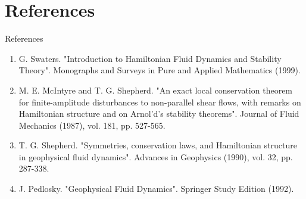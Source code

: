 \documentclass{beamer}
\begin{document}
	\section{References}
		\begin{frame}{References}
			\begin{enumerate}
				\item G. Swaters. "Introduction to Hamiltonian Fluid Dynamics and Stability Theory". Monographs and Surveys in Pure and Applied Mathematics (1999).
				\item  M. E. McIntyre and T. G. Shepherd. "An exact local conservation theorem for finite-amplitude disturbances to non-parallel shear flows, with remarks on Hamiltonian structure and on Arnol’d’s stability theorems". Journal of Fluid Mechanics (1987), vol. 181, pp. 527-565.
				\item T. G. Shepherd. "Symmetries, conservation laws, and Hamiltonian structure in geophysical fluid dynamics". Advances in Geophysics (1990), vol. 32, pp. 287-338.
				\item J. Pedlosky. "Geophysical Fluid Dynamics". Springer Study Edition (1992).
			\end{enumerate}
		\end{frame}
\end{document}
